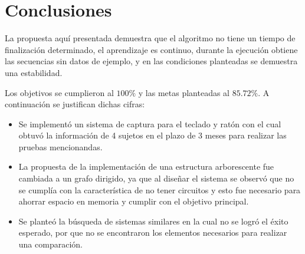 \section{Conclusiones}
La propuesta aqu\'{i} presentada demuestra que el algoritmo no tiene
 un tiempo de finalizaci\'on determinado, el aprendizaje es continuo, durante 
 la ejecuci\'on obtiene las secuencias sin datos de ejemplo, y en las
 condiciones planteadas se demuestra una estabilidad.
 
 
Los objetivos se cumplieron al $100\%$ y las metas planteadas al $85.72\%$. A 
 continuaci\'on se justifican dichas cifras:


\begin{itemize}
\item {
Se implement\'o un sistema de captura para el teclado y rat\'on con el cual 
 obtuv\'o la informaci\'on de 4 sujetos en el plazo de 3 meses para 
 realizar las pruebas mencionandas.
}
	
\item {
La propuesta de la implementaci\'on de una estructura arborescente fue cambiada
 a un grafo dirigido, ya que al dise\~nar el sistema se observ\'o que no se 
 cumpl\'ia con la caracter\'istica de no tener circuitos y esto fue necesario
 para ahorrar espacio en memoria y cumplir con el objetivo principal.
}

\item {
Se plante\'o la b\'usqueda de sistemas similares en la cual no se logr\'o 
 el \'exito esperado, por que no se encontraron los elementos necesarios 
 para realizar una comparaci\'on.
}
\end{itemize}

